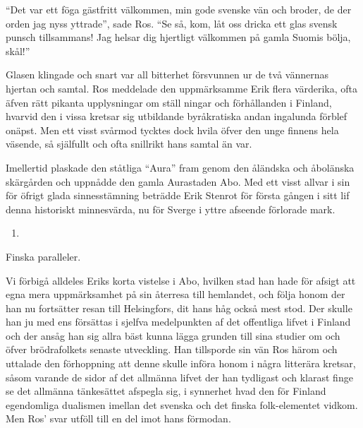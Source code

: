 ``Det var ett föga gästfritt välkommen, min gode svenske vän och broder,
de der orden jag nyss yttrade'', sade Ros. ``Se så, kom, låt oss dricka
ett glas svensk punsch tillsammans! Jag helsar dig hjertligt välkommen
på gamla Suomis bölja, skål!''

Glasen klingade och snart var all bitterhet försvunnen ur de två
vännernas hjertan och samtal. Ros meddelade den uppmärksamme Erik flera
värderika, ofta äfven rätt pikanta upplysningar om ställ ningar och
förhållanden i Finland, hvarvid den i vissa kretsar sig utbildande
byråkratiska andan ingalunda förblef onäpst. Men ett visst svårmod
tycktes dock hvila öfver den unge finnens hela väsende, så själfullt och
ofta snillrikt hans samtal än var.

Imellertid plaskade den ståtliga ``Aura'' fram genom den åländska och
åbolänska skärgården och uppnådde den gamla Aurastaden Abo. Med ett
visst allvar i sin för öfrigt glada sinnesstämning beträdde Erik Stenrot
för första gången i sitt lif denna historiskt minnesvärda, nu för Sverge
i yttre afseende förlorade mark.

\begin{enumerate}
\def\labelenumi{\arabic{enumi}.}
\setcounter{enumi}{4}
\tightlist
\item
\end{enumerate}

Finska paralleler.

Vi förbigå alldeles Eriks korta vistelse i Abo, hvilken stad han hade
för afsigt att egna mera uppmärksamhet på sin återresa till hemlandet,
och följa honom der han nu fortsätter resan till Helsingfors, dit hans
håg också mest stod. Der skulle han ju med ens försättas i sjelfva
medelpunkten af det offentliga lifvet i Finland och der ansåg han sig
allra bäst kunna lägga grunden till sina studier om och öfver
brödrafolkets senaste utveckling. Han tillsporde sin vän Ros härom och
uttalade den förhoppning att denne skulle införa honom i några litterära
kretsar, såsom varande de sidor af det allmänna lifvet der han tydligast
och klarast finge se det allmänna tänkesättet afspegla sig, i synnerhet
hvad den för Finland egendomliga dualismen imellan det svenska och det
finska folk-elementet vidkom. Men Ros' svar utföll till en del imot hans
förmodan.

